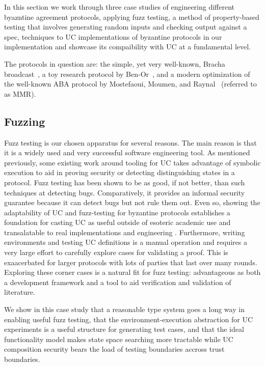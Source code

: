 In this section we work through three case studies of engineering different byazntine agreement protocols, applying fuzz testing, a method of property-based testing that involves generating random inputs and checking output against a spec, techniques to UC implementations of byzantine protocols in our implementation and showcase its compaibility with UC at a fundamental level.

The protocols in question are: the simple, yet very well-known, Bracha broadcast~\cite{bracha}, a toy research protocol by Ben-Or~\cite{benor}, and a modern optimization of the well-known ABA protocol by Mostefaoui, Moumen, and Raynal~\cite{mmr,aba} (referred to as MMR).

\subsection{Fuzzing}
Fuzz testing is our chosen apparatus for several reasons. The main reason is that it is a widely used and very successful software engineering tool.
As mentioned previously, some existing work around tooling for UC takes advantage of symbolic execution to aid in proving security or detecting distinguishing states in a protocol.
Fuzz testing has been shown to be as good, if not better, than such techniques at detecting bugs.
Comparatively, it provides an informal security guarantee because it can detect bugs but not rule them out.
Even so, showing the adaptability of UC and fuzz-testing for byzantine protocols establishes a foundation for casting UC as useful outside of esoteric academic use and transalatable to real implementations and engineering .
Furthermore, writing environments and testing UC definitions is a manual operation and requires a very large effort to carefully explore cases for validating a proof. This is exaacerbated for larger protocols with lots of parties that last over many rounds. 
Exploring these corner cases is a natural fit for fuzz testing: advantageous as both a development framework and a tool to aid verification and validation of literature.

We show in this case study that a reasonable type system goes a long way in enabling useful fuzz testing, that the environment-execution abstraction for UC experiments is a useful structure for generating test cases, and that the ideal functionality model makes state space searching more tractable while UC composition security bears the load of testing boundaries accross trust boundaries.

